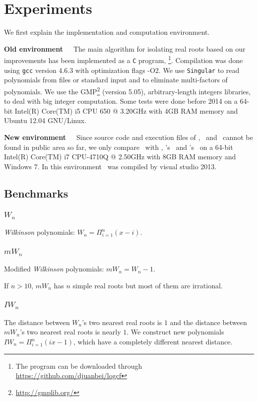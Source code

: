 
\section{Experiments}
\label{sec:exp}

We first explain the implementation and computation environment.

{\bf Old environment}\ \ \
The main algorithm for isolating real roots based on our improvements has been implemented as a \texttt{C} program, \froot \footnote{The program can be downloaded through \url{https://github.com/djuanbei/logcf}}. Compilation was done using {\tt gcc} version 4.6.3 with optimization flags -O2.
We use {\tt Singular} \cite{singular} to read polynomials from files or standard input and to eliminate multi-factors of polynomials. We use the GMP\footnote{ \url{http://gmplib.org/}}
(version 5.05), arbitrary-length integers libraries, to deal with big integer computation.
Some tests were done before 2014   on a 64-bit Intel(R) Core(TM) i5 CPU 650 @ 3.20GHz with 4GB RAM memory and Ubuntu 12.04 GNU/Linux.

{\bf New environment}\ \ \
Since   source code and execution files
	of    \eign, \cf\ and \sle\  cannot be found in public area so far, we only compare \froot\ with \AND, \MM's \inte\  and  \MAPLE's \REALROOT\  on   a 64-bit Intel(R) Core(TM) i7 CPU-4710Q @ 2.50GHz with 8GB RAM memory and Windows 7. In this environment \froot\ was compiled by visual studio 2013.

\subsection{Benchmarks }
 \subsubsection{$W_n$}
 {\it Wilkinson} polynomials: $W_n=\Pi_{i=1}^n(x-i)$. %
  \subsubsection{$mW_n$}
  Modified {\it Wilkinson} polynomials: $mW_n=W_n-1$.

  If $n>10$, $mW_n$ has $n$ simple real roots but most of them are irrational.
 \subsubsection{$IW_n$}
 The distance between  $W_n$'s two  nearest real roots  is  $1$ and the distance between $mW_n$'s two nearest real roots  is nearly $1$. %
 We construct new polynomials $IW_n=\Pi_{i=1}^n(ix-1)$, which have a completely different nearest distance. %
